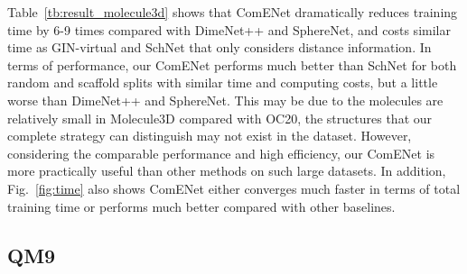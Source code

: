 \documentclass{article}
\begin{document}
Table~\ref{tb:result_molecule3d} shows that
ComENet dramatically reduces training time by 6-9 times compared with DimeNet++ and SphereNet, 
and costs similar time as GIN-virtual and SchNet that only considers distance information. 
In terms of performance, our ComENet performs much better than SchNet for both random and scaffold splits with similar time and computing costs, 
but a little worse than DimeNet++ and SphereNet. 
This may be due to the molecules are relatively small in Molecule3D compared with OC20, 
the structures that our complete strategy can distinguish may not exist in the dataset. 
However, considering the comparable performance and high efficiency,
our ComENet is more practically useful than other methods on such large datasets.
In addition, Fig.~\ref{fig:time} also shows ComENet either converges much faster in terms of total training time or performs much better compared with other baselines.

\subsection{QM9} \label{sec:exp_qm9}
\end{document}
